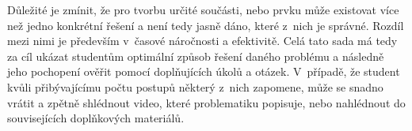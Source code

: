 Důležité je zmínit, že pro tvorbu určité součásti, nebo prvku může existovat více než jedno konkrétní řešení a není tedy jasně dáno, které z~nich je správné.
Rozdíl mezi nimi je především v~časové náročnosti a efektivitě.
Celá tato sada má tedy za cíl ukázat studentům optimální způsob řešení daného problému a následně jeho pochopení ověřit pomocí doplňujících úkolů a otázek.
V~případě, že student kvůli přibývajícímu počtu postupů některý z~nich zapomene, může se snadno vrátit a zpětně shlédnout video, které problematiku popisuje, nebo nahlédnout do souvisejících doplňkových materiálů.

\newpage
